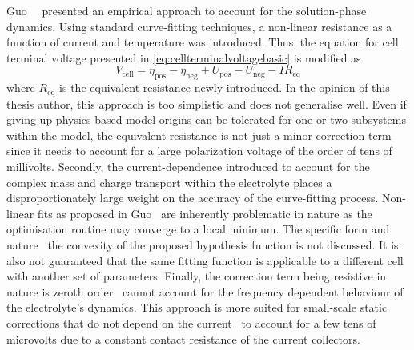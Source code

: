 Guo~\etal~\cite{Guo2011a}  presented an  empirical approach  to account  for the
solution-phase dynamics.  Using standard curve-fitting techniques,  a non-linear
resistance as  a function of current  and temperature was introduced.  Thus, the
equation for cell terminal voltage presented
in \cref{eq:cellterminalvoltagebasic} is modified as
\begin{equation}
    V_\text{cell} = η_\text{pos} - η_\text{neg} + U_\text{pos} - U_\text{neg} - I R_\text{eq}
\end{equation}
where  $R_\text{eq}$  is the  equivalent  resistance  newly introduced.  In  the
opinion of  this thesis  author, this  approach is too  simplistic and  does not
generalise well. Even if giving up  physics-based model origins can be tolerated
for one  or two subsystems  within the model,  the equivalent resistance  is not
just a minor correction term since it  needs to account for a large polarization
voltage of  the order  of tens of  millivolts. Secondly,  the current-dependence
introduced  to account  for the  complex mass  and charge  transport within  the
electrolyte  places a  disproportionately large  weight on  the accuracy  of the
curve-fitting process. Non-linear fits as proposed in Guo~\etal{} are inherently
problematic  in nature  as  the optimisation  routine may  converge  to a  local
minimum.  The specific  form and  nature \eg~the convexity  of the  proposed
hypothesis function  is not discussed. It  is also not guaranteed  that the same
fitting  function  is  applicable  to  a different  cell  with  another  set  of
parameters. Finally,  the correction  term being resistive  in nature  is zeroth
order \ie~cannot account  for  the  frequency  dependent behaviour  of  the
electrolyte's  dynamics. This  approach is  more suited  for small-scale  static
corrections that do not depend on the current \eg~to account for a few tens of
microvolts due to a constant contact resistance of the current collectors.


